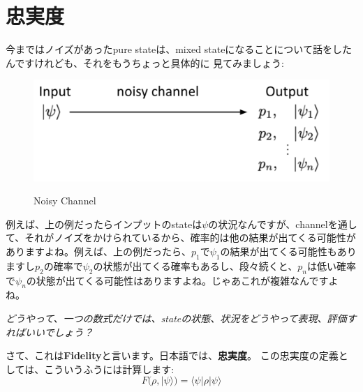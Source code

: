 \section{忠実度}
今まではノイズがあったpure stateは、mixed stateになることについて話をしたんですけれども、それをもうちょっと具体的に
見てみましょう:
\begin{figure}[H]
    \centering
    \includegraphics[width=1.0\textwidth]{lesson3/noisy_channel_buildup.pdf}
    \label{fig: 1}
    \begin{center}
        \caption{Noisy Channel}
    \end{center}
\end{figure}
例えば、上の例だったらインプットのstateは$\psi$の状況なんですが、channelを通して、それがノイズをかけられているから、確率的は他の結果が出てくる可能性がありますよね。例えば、上の例だったら、$p_1$で$\psi_1$の結果が出てくる可能性もありますし$p_2$の確率で$\psi_2$の状態が出てくる確率もあるし、段々続くと、$p_n$は低い確率で$\psi_n$の状態が出てくる可能性はありますよね。じゃあこれが複雑なんですよね。

\textit{どうやって、一つの数式だけでは、stateの状態、状況をどうやって表現、評価すればいいでしょう？}

さて、これは\textbf{Fidelity}と言います。日本語では、\textbf{忠実度}。
この忠実度の定義としては、こういうふうには計算します:
\begin{equation}
F(\rho,|\psi\rangle)=\langle\psi|\rho| \psi\rangle
\end{equation}

